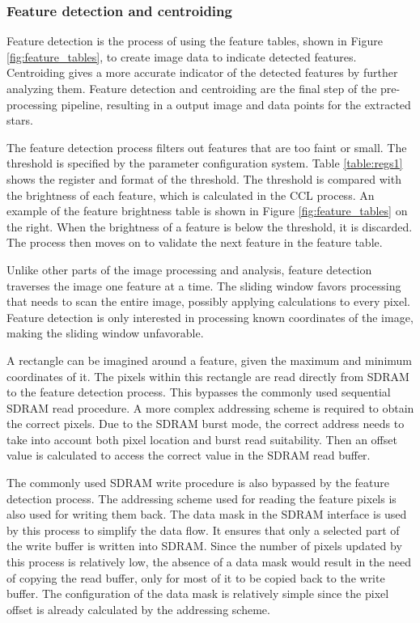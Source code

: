 \documentclass[12pt]{report}
\begin{document}
\subsubsection{Feature detection and centroiding}
Feature detection is the process of using the feature tables, shown in Figure \ref*{fig:feature_tables}, to create image data to indicate detected features. Centroiding gives a more accurate indicator of the detected features by further analyzing them. Feature detection and centroiding are the final step of the pre-processing pipeline, resulting in a output image and data points for the extracted stars. 
\par
The feature detection process filters out features that are too faint or small. The threshold is specified by the parameter configuration system. Table \ref*{table:regs1} shows the register and format of the threshold. The threshold is compared with the brightness of each feature, which is calculated in the CCL process. An example of the feature brightness table is shown in Figure \ref*{fig:feature_tables} on the right. When the brightness of a feature is below the threshold, it is discarded. The process then moves on to validate the next feature in the feature table.
\par
Unlike other parts of the image processing and analysis, feature detection traverses the image one feature at a time. The sliding window favors processing that needs to scan the entire image, possibly applying calculations to every pixel. Feature detection is only interested in processing known coordinates of the image, making the sliding window unfavorable.
\par
A rectangle can be imagined around a feature, given the maximum and minimum coordinates of it. The pixels within this rectangle are read directly from SDRAM to the feature detection process. This bypasses the commonly used sequential SDRAM read procedure. A more complex addressing scheme is required to obtain the correct pixels. Due to the SDRAM burst mode, the correct address needs to take into account both pixel location and burst read suitability. Then an offset value is calculated to access the correct value in the SDRAM read buffer.
\par
The commonly used SDRAM write procedure is also bypassed by the feature detection process. The addressing scheme used for reading the feature pixels is also used for writing them back. The data mask in the SDRAM interface is used by this process to simplify the data flow. It ensures that only a selected part of the write buffer is written into SDRAM. Since the number of pixels updated by this process is relatively low, the absence of a data mask would result in the need of copying the read buffer, only for most of it to be copied back to the write buffer. The configuration of the data mask is relatively simple since the pixel offset is already calculated by the addressing scheme.
\end{document}
